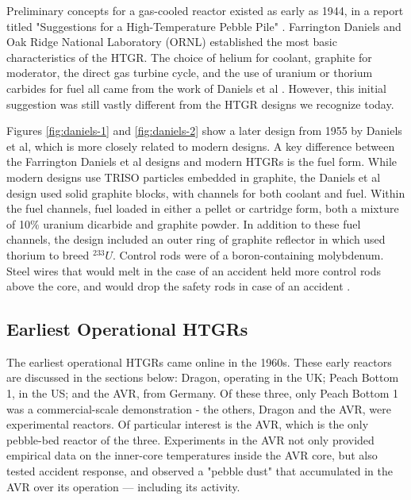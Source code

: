 Preliminary concepts for a gas-cooled reactor existed as early as 1944, in a report titled "Suggestions for a High-Temperature Pebble Pile" \cite{daniels_suggestions_1944}.  Farrington Daniels and Oak Ridge National Laboratory (ORNL) established the most basic characteristics of the HTGR.  The choice of helium for coolant, graphite for moderator, the direct gas turbine cycle, and the use of uranium or thorium carbides for fuel all came from the work of Daniels et al \cite{simnad_early_1991}.  However, this initial suggestion was still vastly different from the HTGR designs we recognize today.




Figures \ref{fig:daniels-1} and \ref{fig:daniels-2} show a later design from 1955 by Daniels et al, which is more closely related to modern designs.  A key difference between the Farrington Daniels et al designs and modern HTGRs is the fuel form.  While modern designs use TRISO particles embedded in graphite, the Daniels et al design used solid graphite blocks, with channels for both coolant and fuel.  Within the fuel channels, fuel loaded in either a pellet or cartridge form, both a mixture of 10$\%$ uranium dicarbide and graphite powder.  In addition to these fuel channels, the design included an outer ring of graphite reflector in which used thorium to breed $^{233}U$.  Control rods were of a boron-containing molybdenum.  Steel wires that would melt in the case of an accident held more control rods above the core, and would drop the safety rods in case of an accident \cite{simnad_early_1991}.

\subsection{Earliest Operational HTGRs}

The earliest operational HTGRs came online in the 1960s.  These early reactors are discussed in the sections below: Dragon, operating in the UK; Peach Bottom 1, in the US; and the AVR, from Germany.  Of these three, only Peach Bottom 1 was a commercial-scale demonstration - the others, Dragon and the AVR, were experimental reactors.  Of particular interest is the AVR, which is the only pebble-bed reactor of the three.  Experiments in the AVR not only provided empirical data on the inner-core temperatures inside the AVR core, but also tested accident response, and observed a "pebble dust" that accumulated in the AVR over its operation --- including its activity.

